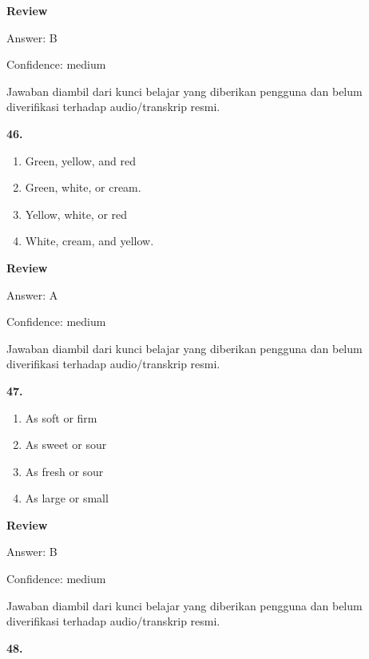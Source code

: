 \documentclass[12pt]{article}
\begin{document}
\par
\begingroup
\setlength{\parskip}{0pt}
\setlength{\parindent}{0pt}
\textbf{Review}\par
Answer: B\par
Confidence: medium\par
Jawaban diambil dari kunci belajar yang diberikan pengguna dan belum diverifikasi terhadap audio/transkrip resmi.\par
\endgroup
\par
\vspace{0.25\baselineskip}
\noindent\textbf{46.}
\begin{enumerate}[label=(\Alph*),leftmargin=*,itemsep=0.2em]
\item Green, yellow, and red
\item Green, white, or cream.
\item Yellow, white, or red
\item White, cream, and yellow.
\end{enumerate}
\par
\begingroup
\setlength{\parskip}{0pt}
\setlength{\parindent}{0pt}
\textbf{Review}\par
Answer: A\par
Confidence: medium\par
Jawaban diambil dari kunci belajar yang diberikan pengguna dan belum diverifikasi terhadap audio/transkrip resmi.\par
\endgroup
\par
\vspace{0.25\baselineskip}
\noindent\textbf{47.}
\begin{enumerate}[label=(\Alph*),leftmargin=*,itemsep=0.2em]
\item As soft or firm
\item As sweet or sour
\item As fresh or sour
\item As large or small
\end{enumerate}
\par
\begingroup
\setlength{\parskip}{0pt}
\setlength{\parindent}{0pt}
\textbf{Review}\par
Answer: B\par
Confidence: medium\par
Jawaban diambil dari kunci belajar yang diberikan pengguna dan belum diverifikasi terhadap audio/transkrip resmi.\par
\endgroup
\par
\vspace{0.25\baselineskip}
\noindent\textbf{48.}
\end{document}
